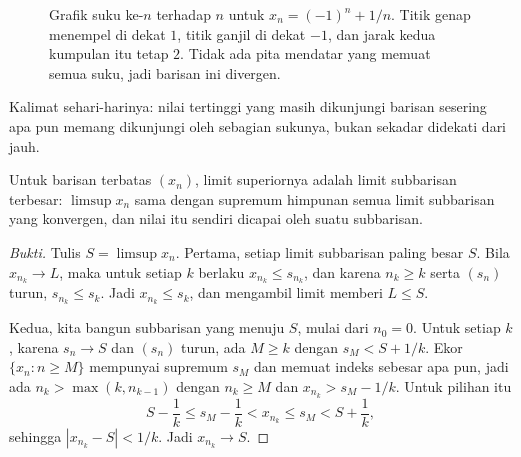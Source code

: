 \begin{figure}[htbp]
\centering
{}
\caption{Grafik suku ke-$n$ terhadap $n$ untuk $x_n=(-1)^n+1/n$. Titik genap
menempel di dekat $1$, titik ganjil di dekat $-1$, dan jarak kedua kumpulan itu
tetap $2$. Tidak ada pita mendatar yang memuat semua suku, jadi barisan ini
divergen.}
\label{fig:divergen-ayun}
\end{figure}

Kalimat sehari-harinya: nilai tertinggi yang masih dikunjungi barisan sesering apa
pun memang dikunjungi oleh sebagian sukunya, bukan sekadar didekati dari jauh.

\begin{teorema}
Untuk barisan terbatas $(x_n)$, limit superiornya adalah limit subbarisan
terbesar: $\limsup x_n$ sama dengan supremum himpunan semua limit subbarisan yang
konvergen, dan nilai itu sendiri dicapai oleh suatu subbarisan.
\end{teorema}

\begin{proof}[Bukti]
Tulis $S=\limsup x_n$. Pertama, setiap limit subbarisan paling besar $S$. Bila
$x_{n_k} \to L$, maka untuk setiap $k$ berlaku $x_{n_k} \le s_{n_k}$, dan karena
$n_k \ge k$ serta $(s_n)$ turun, $s_{n_k} \le s_k$. Jadi $x_{n_k} \le s_k$, dan
mengambil limit memberi $L \le S$.

Kedua, kita bangun subbarisan yang menuju $S$, mulai dari $n_0=0$. Untuk setiap $k$,
karena $s_n \to S$ dan $(s_n)$ turun, ada $M \ge k$ dengan $s_M<S+1/k$. Ekor
$\{x_n : n \ge M\}$ mempunyai supremum $s_M$ dan memuat indeks sebesar apa pun, jadi
ada $n_k>\max(k,n_{k-1})$ dengan $n_k \ge M$ dan $x_{n_k}>s_M-1/k$. Untuk pilihan itu
\[
S - \frac1k \le s_M - \frac1k < x_{n_k} \le s_M < S + \frac1k ,
\]
sehingga $|x_{n_k}-S|<1/k$. Jadi $x_{n_k} \to S$.
\end{proof}

